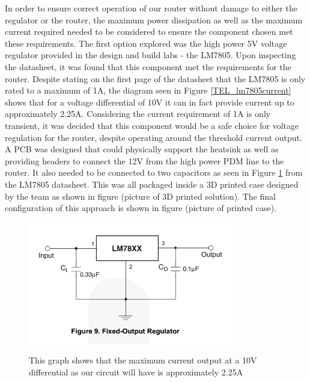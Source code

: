 In order to ensure correct operation of our router without damage to either the regulator or the router, the maximum power dissipation as well as the maximum current required needed to be considered to ensure the component chosen met these requirements. The first option explored was the high power 5V voltage regulator provided in the design and build labs - the LM7805. Upon inspecting the datasheet, it was found that this component met the requirements for the router. Despite stating on the first page of the datasheet that the LM7805 is only rated to a maximum of 1A\cite{MAN_lm7805}, the diagram seen in Figure \ref{TEL_lm7805current} shows that for a voltage differential of 10V it can in fact provide current up to approximately 2.25A. Considering the current requirement of 1A is only transient, it was decided that this component would be a safe choice for voltage regulation for the router, despite operating around the threshold current output. A PCB was designed that could physically support the heatsink as well as providing headers to connect the 12V from the high power PDM line to the router. It also needed to be connected to two capacitors as seen in Figure \ref{TEL_lm7805config} from the LM7805 datasheet\cite{MAN_lm7805}. This was all packaged inside a 3D printed case designed by the team as shown in figure (picture of 3D printed solution). The final configuration of this approach is shown in figure (picture of printed case).

\begin{figure}[ht]
  \caption{This graph shows that the maximum current output at a 10V differential as our circuit will have is approximately 2.25A}
  \centering
    \includegraphics[width=0.8\textwidth]{Images/Telemetry/TEL_lm7805config.png}
    \label{TEL_lm7805config}
\end{figure}

